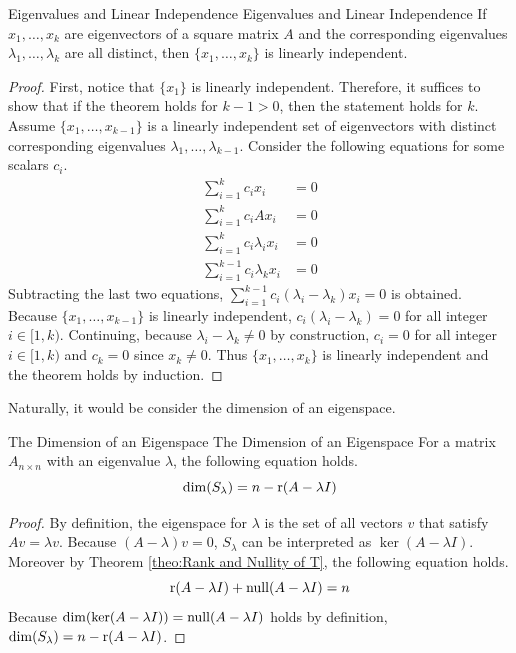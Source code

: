\documentclass[../main.tex]{subfiles}
\begin{document}
\begin{theorem}{Eigenvalues and Linear Independence}
{Eigenvalues and Linear Independence}
If $x_1, \ldots, x_k$ are eigenvectors of a square matrix $A$
and the corresponding eigenvalues $\lambda_1, \ldots, \lambda_k$
are all distinct, then $\{ x_1, \ldots, x_k \}$ is linearly
independent.
\end{theorem}
\begin{proof}
First, notice that $\{ x_1 \}$ is linearly independent. Therefore,
it suffices to show that if the theorem holds for $k - 1 > 0$, then
the statement holds for $k$. Assume $\{ x_1, \ldots, x_{k-1} \}$
is a linearly independent set of eigenvectors with distinct
corresponding eigenvalues $\lambda_1, \ldots, \lambda_{k-1}$.
Consider the following equations for some scalars $c_i$.
\begin{align*}
    \sum_{i=1}^k c_i x_i &= 0 \\
    \sum_{i=1}^k c_i A x_i &= 0 \\
    \sum_{i=1}^k c_i \lambda_i x_i &= 0 \\
    \sum_{i=1}^{k-1} c_i \lambda_k x_i &= 0
\end{align*}
Subtracting the last two equations, $\sum_{i=1}^{k-1} c_i
(\lambda_i - \lambda_k) x_i = 0$ is obtained. Because
$\{ x_1, \ldots, x_{k-1} \}$ is linearly independent, $c_i
(\lambda_i - \lambda_k) = 0$ for all integer $i \in [1, k)$.
Continuing, because $\lambda_i - \lambda_k \neq 0$ by construction,
$c_i = 0$ for all integer $i \in [1, k)$ and $c_k = 0$ since
$x_k \neq 0$. Thus $\{ x_1, \ldots, x_k \}$ is linearly independent
and the theorem holds by induction.
\end{proof}

Naturally, it would be consider the dimension of an eigenspace.

\begin{theorem}{The Dimension of an Eigenspace}
{The Dimension of an Eigenspace}
For a matrix $A_{n \times n}$ with an eigenvalue $\lambda$,
the following equation holds.
\[
\dim(S_\lambda) = n - \operatorname{r}(A - \lambda I)
\]
\end{theorem}
\begin{proof}
By definition, the eigenspace for $\lambda$ is the set of all
vectors $v$ that satisfy $Av = \lambda v$. Because $(A - \lambda) v =
0$, $S_\lambda$ can be interpreted as $\ker(A - \lambda I)$.
Moreover by Theorem \ref{theo:Rank and Nullity of T}, the following
equation holds.
\[
\operatorname{r}(A - \lambda I) + \operatorname{null}(A - \lambda I) = n
\]
Because $\dim(\ker(A - \lambda I)) = \operatorname{null}(A - \lambda I)$ holds by
definition, $\dim(S_\lambda) = n - \operatorname{r}(A - \lambda I)$.
\end{proof}
\end{document}
